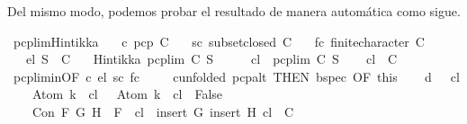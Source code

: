 \begin{isabellebody}
\isamarkupfalse%
%
\endisatagproof
{\isafoldproof}%
%
\isadelimproof
%
\endisadelimproof
%
\begin{isamarkuptext}%
Del mismo modo, podemos probar el resultado de manera automática como sigue.%
\end{isamarkuptext}\isamarkuptrue%
\isamarkupfalse%
\ pcp{\isacharunderscore}lim{\isacharunderscore}Hintikka{\isacharcolon}\isanewline
\ \ \ c{\isacharcolon}\ {\isachardoublequoteopen}pcp\ C{\isachardoublequoteclose}\isanewline
\ \ \ sc{\isacharcolon}\ {\isachardoublequoteopen}subset{\isacharunderscore}closed\ C{\isachardoublequoteclose}\isanewline
\ \ \ fc{\isacharcolon}\ {\isachardoublequoteopen}finite{\isacharunderscore}character\ C{\isachardoublequoteclose}\isanewline
\ \ \ el{\isacharcolon}\ {\isachardoublequoteopen}S\ {\isasymin}\ C{\isachardoublequoteclose}\isanewline
\ \ \ {\isachardoublequoteopen}Hintikka\ {\isacharparenleft}pcp{\isacharunderscore}lim\ C\ S{\isacharparenright}{\isachardoublequoteclose}\isanewline
%
\isadelimproof
%
\endisadelimproof
%
\isatagproof
{}\isamarkupfalse%
\ {\isacharminus}\isanewline
\ \ \isamarkupfalse%
\ {\isacharquery}cl\ {\isacharequal}\ {\isachardoublequoteopen}pcp{\isacharunderscore}lim\ C\ S{\isachardoublequoteclose}\isanewline
\ \ \isamarkupfalse%
\ {\isachardoublequoteopen}{\isacharquery}cl\ {\isasymin}\ C{\isachardoublequoteclose}\ \isamarkupfalse%
\ pcp{\isacharunderscore}lim{\isacharunderscore}in{\isacharbrackleft}OF\ c\ el\ sc\ fc{\isacharbrackright}\ \isacommand{{\isachardot}}\isamarkupfalse%
\isanewline
\ \ \isamarkupfalse%
\ c{\isacharbrackleft}unfolded\ pcp{\isacharunderscore}alt{\isacharcomma}\ THEN\ bspec{\isacharcomma}\ OF\ this{\isacharbrackright}\isanewline
\ \ \isamarkupfalse%
\ d{\isacharcolon}\ {\isachardoublequoteopen}{\isasymbottom}\ {\isasymnotin}\ {\isacharquery}cl{\isachardoublequoteclose}\isanewline
\ \ \ \ {\isachardoublequoteopen}Atom\ k\ {\isasymin}\ {\isacharquery}cl\ {\isasymLongrightarrow}\ \isactrlbold {\isasymnot}\ {\isacharparenleft}Atom\ k{\isacharparenright}\ {\isasymin}\ {\isacharquery}cl\ {\isasymLongrightarrow}\ False{\isachardoublequoteclose}\isanewline
\ \ \ \ {\isachardoublequoteopen}Con\ F\ G\ H\ {\isasymLongrightarrow}\ F\ {\isasymin}\ {\isacharquery}cl\ {\isasymLongrightarrow}\ insert\ G\ {\isacharparenleft}insert\ H\ {\isacharquery}cl{\isacharparenright}\ {\isasymin}\ C{\isachardoublequoteclose}\isanewline

\end{isabellebody}
